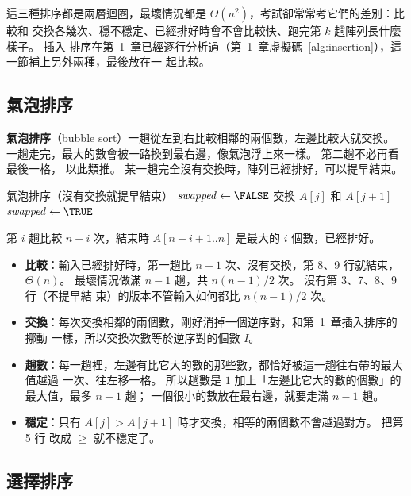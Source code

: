 這三種排序都是兩層迴圈，最壞情況都是 $\Theta(n^2)$，考試卻常常考它們的差別：比較和
交換各幾次、穩不穩定、已經排好時會不會比較快、跑完第 $k$ 趟陣列長什麼樣子。 插入
排序在第~1~章已經逐行分析過（第~1~章虛擬碼~\ref{alg:insertion}），這一節補上另外兩種，最後放在一
起比較。

\subsection{氣泡排序}

\textbf{氣泡排序}（bubble sort）一趟從左到右比較相鄰的兩個數，左邊比較大就交換。
一趟走完，最大的數會被一路換到最右邊，像氣泡浮上來一樣。 第二趟不必再看最後一格，
以此類推。 某一趟完全沒有交換時，陣列已經排好，可以提早結束。

\begin{pseudo}[label=alg:so-bubble]{氣泡排序（沒有交換就提早結束）}
        \State $\mathit{swapped} \gets \FALSE$
                \State 交換 $A[j]$ 和 $A[j + 1]$
                \State $\mathit{swapped} \gets \TRUE$
            \EndIf
        \EndFor
            \State \Return
        \EndIf
    \EndFor
\EndProcedure
\end{pseudo}

第 $i$ 趟比較 $n - i$ 次，結束時 $A[n-i+1..n]$ 是最大的 $i$ 個數，已經排好。

\begin{itemize}
\item \textbf{比較}：輸入已經排好時，第一趟比 $n - 1$ 次、沒有交換，第 8、9 行就結束，
$\Theta(n)$。 最壞情況做滿 $n - 1$ 趟，共 $n(n-1)/2$ 次。 沒有第 3、7、8、9 行（不提早結
束）的版本不管輸入如何都比 $n(n-1)/2$ 次。
\item \textbf{交換}：每次交換相鄰的兩個數，剛好消掉一個逆序對，和第~1~章插入排序的挪動
一樣，所以交換次數等於逆序對的個數 $I$。
\item \textbf{趟數}：每一趟裡，左邊有比它大的數的那些數，都恰好被這一趟往右帶的最大值越過
一次、往左移一格。 所以趟數是 $1$ 加上「左邊比它大的數的個數」的最大值，最多 $n - 1$ 趟；
一個很小的數放在最右邊，就要走滿 $n - 1$ 趟。
\item \textbf{穩定}：只有 $A[j] > A[j+1]$ 時才交換，相等的兩個數不會越過對方。 把第 5 行
改成 $\ge$ 就不穩定了。
\end{itemize}

\subsection{選擇排序}

